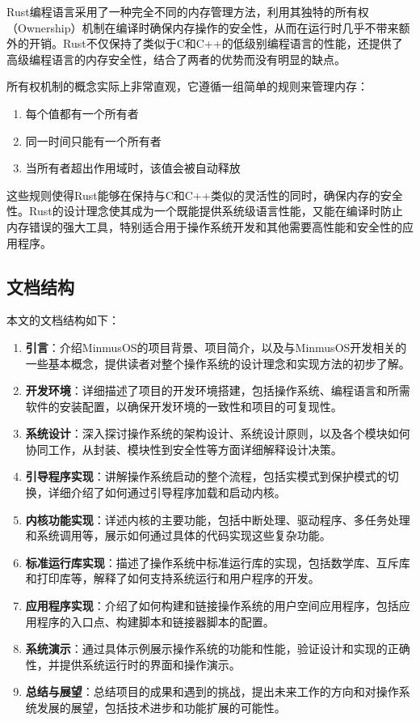 Rust编程语言采用了一种完全不同的内存管理方法，利用其独特的所有权（Ownership）机制在编译时确保内存操作的安全性，从而在运行时几乎不带来额外的开销。Rust不仅保持了类似于C和C++的低级别编程语言的性能，还提供了高级编程语言的内存安全性，结合了两者的优势而没有明显的缺点。

所有权机制的概念实际上非常直观，它遵循一组简单的规则来管理内存：

\begin{enumerate}
    \item 每个值都有一个所有者
    \item 同一时间只能有一个所有者
    \item 当所有者超出作用域时，该值会被自动释放
\end{enumerate}

这些规则使得Rust能够在保持与C和C++类似的灵活性的同时，确保内存的安全性。Rust的设计理念使其成为一个既能提供系统级语言性能，又能在编译时防止内存错误的强大工具，特别适合用于操作系统开发和其他需要高性能和安全性的应用程序。

\subsection{文档结构}

本文的文档结构如下：

\begin{enumerate}
    \item \textbf{引言}：介绍MinmusOS的项目背景、项目简介，以及与MinmusOS开发相关的一些基本概念，提供读者对整个操作系统的设计理念和实现方法的初步了解。
    \item \textbf{开发环境}：详细描述了项目的开发环境搭建，包括操作系统、编程语言和所需软件的安装配置，以确保开发环境的一致性和项目的可复现性。
    \item \textbf{系统设计}：深入探讨操作系统的架构设计、系统设计原则，以及各个模块如何协同工作，从封装、模块性到安全性等方面详细解释设计决策。
    \item \textbf{引导程序实现}：讲解操作系统启动的整个流程，包括实模式到保护模式的切换，详细介绍了如何通过引导程序加载和启动内核。
    \item \textbf{内核功能实现}：详述内核的主要功能，包括中断处理、驱动程序、多任务处理和系统调用等，展示如何通过具体的代码实现这些复杂功能。
    \item \textbf{标准运行库实现}：描述了操作系统中标准运行库的实现，包括数学库、互斥库和打印库等，解释了如何支持系统运行和用户程序的开发。
    \item \textbf{应用程序实现}：介绍了如何构建和链接操作系统的用户空间应用程序，包括应用程序的入口点、构建脚本和链接器脚本的配置。
    \item \textbf{系统演示}：通过具体示例展示操作系统的功能和性能，验证设计和实现的正确性，并提供系统运行时的界面和操作演示。
    \item \textbf{总结与展望}：总结项目的成果和遇到的挑战，提出未来工作的方向和对操作系统发展的展望，包括技术进步和功能扩展的可能性。
\end{enumerate}